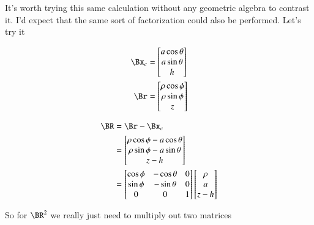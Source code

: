 It's worth trying this same calculation without any geometric algebra to contrast it.  I'd expect that the same sort of factorization could also be performed.  Let's try it

\begin{align}\label{eqn:matrixVectorPotentials:290}
\Bx_c &= 
\begin{bmatrix}
a \cos\theta \\
a \sin\theta \\
h
\end{bmatrix}
\\
\Br &= 
\begin{bmatrix}
\rho \cos\phi \\
\rho \sin\phi \\
z
\end{bmatrix}
\end{align}

\begin{align*}
\BR 
&= \Br - \Bx_c \\
&= 
\begin{bmatrix}
\rho \cos\phi - a \cos\theta \\
\rho \sin\phi - a \sin\theta \\
z - h
\end{bmatrix} \\
&=
\begin{bmatrix}
\cos\phi & - \cos\theta & 0 \\
\sin\phi & - \sin\theta & 0 \\
0 & 0 & 1 
\end{bmatrix}
\begin{bmatrix}
\rho \\
a \\
z - h
\end{bmatrix}
\end{align*}

So for $\BR^2$ we really just need to multiply out two matrices

